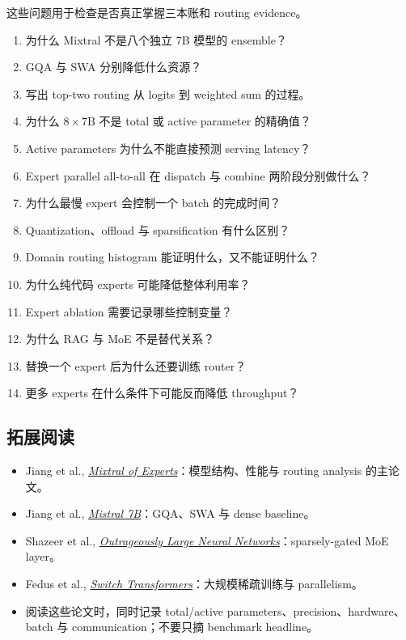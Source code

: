 \documentclass[a4paper]{article}
\begin{document}
这些问题用于检查是否真正掌握三本账和 routing evidence。

\begin{enumerate}
  \item 为什么 Mixtral 不是八个独立 7B 模型的 ensemble？
  \item GQA 与 SWA 分别降低什么资源？
  \item 写出 top-two routing 从 logits 到 weighted sum 的过程。
  \item 为什么 $8\times 7\mathrm{B}$ 不是 total 或 active parameter 的精确值？
  \item Active parameters 为什么不能直接预测 serving latency？
  \item Expert parallel all-to-all 在 dispatch 与 combine 两阶段分别做什么？
  \item 为什么最慢 expert 会控制一个 batch 的完成时间？
  \item Quantization、offload 与 sparsification 有什么区别？
  \item Domain routing histogram 能证明什么，又不能证明什么？
  \item 为什么纯代码 experts 可能降低整体利用率？
  \item Expert ablation 需要记录哪些控制变量？
  \item 为什么 RAG 与 MoE 不是替代关系？
  \item 替换一个 expert 后为什么还要训练 router？
  \item 更多 experts 在什么条件下可能反而降低 throughput？
\end{enumerate}

\subsection{拓展阅读}

\begin{itemize}
  \item Jiang et al., \href{https://arxiv.org/abs/2401.04088}{\emph{Mixtral of Experts}}：模型结构、性能与 routing analysis 的主论文。
  \item Jiang et al., \href{https://arxiv.org/abs/2310.06825}{\emph{Mistral 7B}}：GQA、SWA 与 dense baseline。
  \item Shazeer et al., \href{https://arxiv.org/abs/1701.06538}{\emph{Outrageously Large Neural Networks}}：sparsely-gated MoE layer。
  \item Fedus et al., \href{https://arxiv.org/abs/2101.03961}{\emph{Switch Transformers}}：大规模稀疏训练与 parallelism。
  \item 阅读这些论文时，同时记录 total/active parameters、precision、hardware、batch 与 communication；不要只摘 benchmark headline。
\end{itemize}
\end{document}
